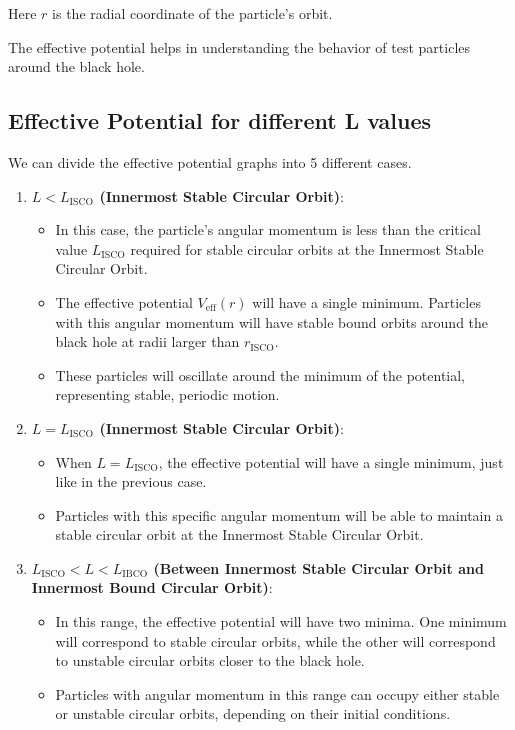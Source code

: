 \documentclass{article}
\begin{document}
Here \( r \) is the radial coordinate of the particle's orbit.

The effective potential helps in understanding the behavior of test particles around the black hole.

\subsection{Effective Potential for different L values}
We can divide the effective potential graphs into 5 different cases.

\begin{enumerate}
    \item \textbf{\( L < L_{\text{ISCO}} \) (Innermost Stable Circular Orbit)}:
    \begin{itemize}
        \item In this case, the particle's angular momentum is less than the critical value \( L_{\text{ISCO}} \) required for stable circular orbits at the Innermost Stable Circular Orbit.
        \item The effective potential \( V_{\text{eff}}(r) \) will have a single minimum. Particles with this angular momentum will have stable bound orbits around the black hole at radii larger than \( r_{\text{ISCO}} \).
        \item These particles will oscillate around the minimum of the potential, representing stable, periodic motion.
    \end{itemize}
    
    \item \textbf{\( L = L_{\text{ISCO}} \) (Innermost Stable Circular Orbit)}:
    \begin{itemize}
        \item When \( L = L_{\text{ISCO}} \), the effective potential will have a single minimum, just like in the previous case.
        \item Particles with this specific angular momentum will be able to maintain a stable circular orbit at the Innermost Stable Circular Orbit.
    \end{itemize}
    
    \item \textbf{\( L_{\text{ISCO}} < L < L_{\text{IBCO}} \) (Between Innermost Stable Circular Orbit and Innermost Bound Circular Orbit)}:
    \begin{itemize}
        \item In this range, the effective potential will have two minima. One minimum will correspond to stable circular orbits, while the other will correspond to unstable circular orbits closer to the black hole.
        \item Particles with angular momentum in this range can occupy either stable or unstable circular orbits, depending on their initial conditions.
    \end{itemize}
    

\end{enumerate}
\end{document}
